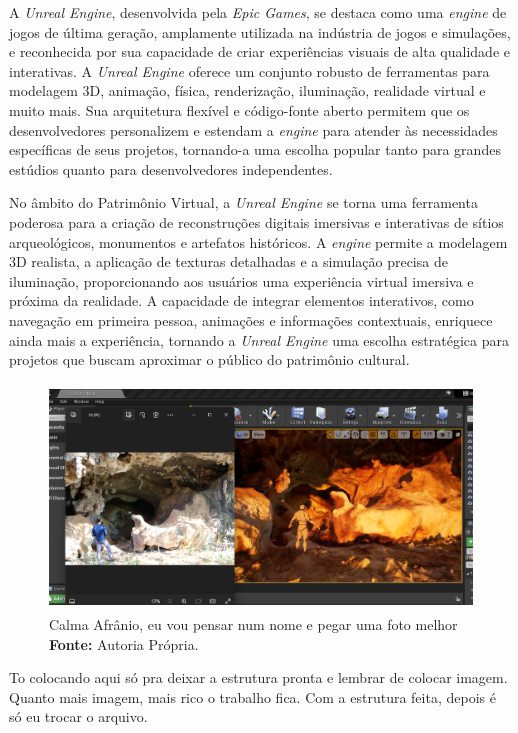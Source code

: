 A \textit{Unreal Engine}, desenvolvida pela\textit{ Epic Games}, se destaca como uma \textit{engine} de jogos de última geração, amplamente utilizada na indústria de jogos e simulações, e reconhecida por sua capacidade de criar experiências visuais de alta qualidade e interativas.  A \textit{Unreal Engine} oferece um conjunto robusto de ferramentas para modelagem 3D, animação, física, renderização, iluminação, realidade virtual e muito mais. Sua arquitetura flexível e código-fonte aberto permitem que os desenvolvedores personalizem e estendam a \textit{engine} para atender às necessidades específicas de seus projetos, tornando-a uma escolha popular tanto para grandes estúdios quanto para desenvolvedores independentes.

No âmbito do Patrimônio Virtual, a \textit{Unreal Engine} se torna uma ferramenta poderosa para a criação de reconstruções digitais imersivas e interativas de sítios arqueológicos, monumentos e artefatos históricos. A \textit{engine} permite a modelagem 3D realista, a aplicação de texturas detalhadas e a simulação precisa de iluminação, proporcionando aos usuários uma experiência virtual imersiva e próxima da realidade. A capacidade de integrar elementos interativos, como navegação em primeira pessoa, animações e informações contextuais, enriquece ainda mais a experiência, tornando a \textit{Unreal Engine} uma escolha estratégica para projetos que buscam aproximar o público do patrimônio cultural.
\begin{figure}[H]
    \centering
    \includegraphics[height=6cm, keepaspectratio]{img/unreal-print.png}
    \caption{Calma Afrânio, eu vou pensar num nome e pegar uma foto melhor \\
    \textbf{Fonte:} Autoria Própria.}
    \label{fig:unreal-print}
\end{figure}
To colocando aqui só pra deixar a estrutura pronta e lembrar de colocar imagem.
Quanto mais imagem, mais rico o trabalho fica. Com a estrutura feita, depois é só eu trocar o arquivo.
